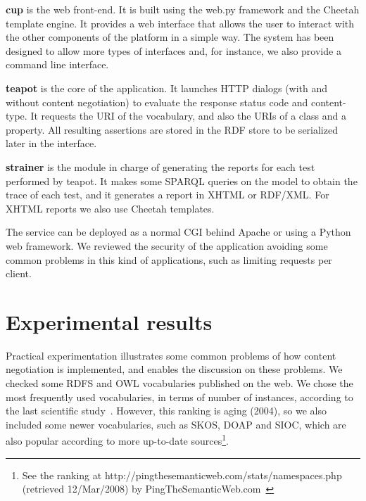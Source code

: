 \documentclass{../templates/llncs}
\begin{document}
\begin{description}

  \item \textbf{cup} is the web front-end. It is built using the web.py framework
        and the Cheetah template engine. It provides a web interface that allows 
        the user to interact with the other components of the platform in a 
        simple way. The system has been designed to allow more types 
        of interfaces and, for instance, we also provide a command line interface.

  \item \textbf{teapot} is the core of the application. It launches
        HTTP dialogs 
        (with and without content negotiation) to evaluate the response
        status code and content-type. It requests the URI of the vocabulary, and 
        also the URIs of a class and a property. All resulting assertions are 
        stored in the RDF store to be serialized later in the interface.

  \item \textbf{strainer} is the module in charge of generating the reports for
        each test performed by teapot. It makes some SPARQL%
        queries on the model to obtain the trace of each test, and it generates 
        a report in XHTML or RDF/XML. For XHTML reports we also use Cheetah 
        templates.

\end{description}

The service can be deployed as a normal CGI behind Apache or using a Python web 
framework. We reviewed the security of the application avoiding some common problems
in this kind of applications, such as limiting requests per client.

\section{\label{sec:experimental}Experimental results}

Practical experimentation illustrates some common problems of how
content negotiation is implemented, and enables the discussion on 
these problems. We checked some RDFS and OWL vocabularies published on the web.
We chose the most frequently used vocabularies, in terms of number of
instances, according to the last scientific study~\cite{Li2005}. However,
this ranking is aging (2004), so we also included some newer
vocabularies, such as SKOS, DOAP and SIOC, which are also popular
according to more up-to-date sources\footnote{See the ranking at http://pingthesemanticweb.com/stats/namespaces.php (retrieved 12/Mar/2008) by PingTheSemanticWeb.com~\cite{Bojars2007}}.
\end{document}
